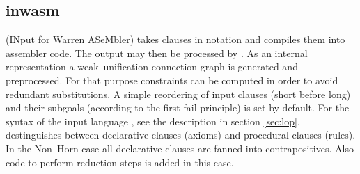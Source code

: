 %
\subsection{inwasm}\label{sec:inwasm}

\Inw\/ (INput for Warren ASeMbler) takes clauses in \LOP\/
notation and compiles them into \SAM\/ assembler code.  The
output  may  then  be  processed  by \wasm. As an internal
representation a weak--unification connection graph  is
generated and preprocessed. For that purpose constraints can be
computed in order to avoid redundant substitutions. A simple
reordering  of  input  clauses (short before long) and their
subgoals (according to the first fail principle) is  set  by
default.  For  the syntax of the input language \LOP, see the
description in section \ref{sec:lop}.  \Inw\/  destinguishes
between  declarative clauses (axioms) and procedural clauses
(rules). In the Non--Horn case all  declarative  clauses  are
fanned  into contrapositives. Also code to perform reduction
steps is added in this case.

